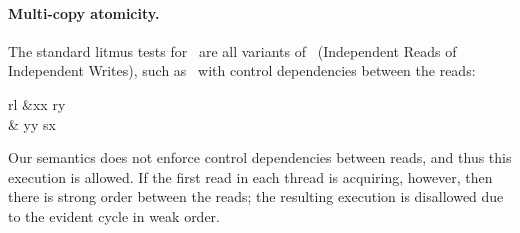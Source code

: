 \paragraph{Multi-copy atomicity.}  The standard litmus tests for \mca\ are
all variants of \iriw\ (Independent Reads of Independent Writes), such as \iriw\
with control dependencies between the reads:
\begin{displaymatharray}{rl}
  &x\SEMI x
  \PAR
  \THEN r\GETS y \FI
 \\{}
  \PAR&
  y\SEMI y
  \PAR
  \THEN s\GETS x \FI
\end{displaymatharray}
\begin{tikzdisplay}[node distance=1em]
\end{tikzdisplay}
Our semantics does not enforce control dependencies between reads, and thus
this execution is allowed.  If the first read in each thread is acquiring,
however, then there is strong order between the reads; the resulting
execution is disallowed due to the evident cycle in weak order.


